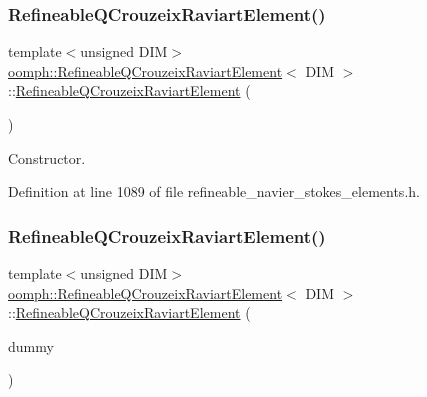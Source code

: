 \subsubsection{\texorpdfstring{Refineable\+Q\+Crouzeix\+Raviart\+Element()}{RefineableQCrouzeixRaviartElement()}\hspace{0.1cm}{\footnotesize\ttfamily [1/2]}}
{\footnotesize\ttfamily template$<$unsigned D\+IM$>$ \\
\hyperlink{classoomph_1_1RefineableQCrouzeixRaviartElement}{oomph\+::\+Refineable\+Q\+Crouzeix\+Raviart\+Element}$<$ D\+IM $>$\+::\hyperlink{classoomph_1_1RefineableQCrouzeixRaviartElement}{Refineable\+Q\+Crouzeix\+Raviart\+Element} (\begin{DoxyParamCaption}{ }\end{DoxyParamCaption})\hspace{0.3cm}{\ttfamily [inline]}}



Constructor. 



Definition at line 1089 of file refineable\+\_\+navier\+\_\+stokes\+\_\+elements.\+h.

\mbox{\label{classoomph_1_1RefineableQCrouzeixRaviartElement_a2d15dd760eb7524fa9b0499e1edbabd2}} 
\subsubsection{\texorpdfstring{Refineable\+Q\+Crouzeix\+Raviart\+Element()}{RefineableQCrouzeixRaviartElement()}\hspace{0.1cm}{\footnotesize\ttfamily [2/2]}}
{\footnotesize\ttfamily template$<$unsigned D\+IM$>$ \\
\hyperlink{classoomph_1_1RefineableQCrouzeixRaviartElement}{oomph\+::\+Refineable\+Q\+Crouzeix\+Raviart\+Element}$<$ D\+IM $>$\+::\hyperlink{classoomph_1_1RefineableQCrouzeixRaviartElement}{Refineable\+Q\+Crouzeix\+Raviart\+Element} (\begin{DoxyParamCaption}\item[{const \hyperlink{classoomph_1_1RefineableQCrouzeixRaviartElement}{Refineable\+Q\+Crouzeix\+Raviart\+Element}$<$ D\+IM $>$ \&}]{dummy }\end{DoxyParamCaption})\hspace{0.3cm}{\ttfamily [inline]}}



